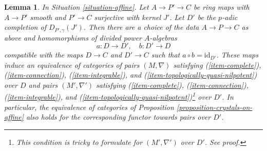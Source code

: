 \documentclass{stacks-project}
\theoremstyle{plain}
\newtheorem{lemma}[subsection]{Lemma}
\theoremstyle{definition}
\theoremstyle{remark}
\numberwithin{equation}{subsection}
\begin{document}
\begin{lemma}
\label{lemma-crystals-on-affine-smooth}
In Situation \ref{situation-affine}.
Let $A \to P' \to C$ be ring maps with $A \to P'$ smooth and $P' \to C$
surjective with kernel $J'$. Let $D'$ be the $p$-adic completion of
$D_{P', \gamma}(J')$. Then there are a choice of the data $A \to P \to C$
as above and homomorphisms of divided power $A$-algebras
$$
a : D \longrightarrow D',\quad b : D' \longrightarrow D
$$
compatible with the maps $D \to C$ and $D' \to C$ such that
$a \circ b = \text{id}_{D'}$. These maps induce
an equivalence of categories of pairs $(M, \nabla)$ satisfying
(\ref{item-complete}), (\ref{item-connection}),
(\ref{item-integrable}), and (\ref{item-topologically-quasi-nilpotent})
over $D$ and pairs $(M', \nabla')$  satisfying
(\ref{item-complete}), (\ref{item-connection}),
(\ref{item-integrable}), and
(\ref{item-topologically-quasi-nilpotent})\footnote{This condition
is tricky to formulate for $(M', \nabla')$ over $D'$. See proof.} over $D'$.
In particular, the equivalence of categories of
Proposition \ref{proposition-crystals-on-affine}
also holds for the corresponding functor towards pairs over $D'$.
\end{lemma}
\end{document}
